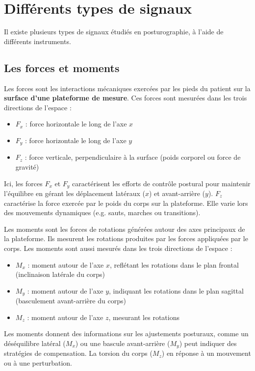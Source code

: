 \section{Différents types de signaux}

Il existe plusieurs types de signaux étudiés en posturographie, à l'aide de différents instruments.

\subsection{Les forces et moments}

Les forces sont les interactions mécaniques exercées par les pieds du patient sur la \textbf{surface d'une plateforme de mesure}.
Ces forces sont mesurées dans les trois directions de l'espace : 
\begin{itemize}
  \item $F_x$ : force horizontale le long de l'axe $x$
  \item $F_y$ : force horizontale le long de l'axe $y$ 
  \item $F_z$ : force verticale, perpendiculaire à la surface (poids corporel ou force de gravité)
\end{itemize}
Ici, les forces $F_x$ et $F_y$ caractérisent les efforts de contrôle postural pour maintenir l'équilibre 
en gérant les déplacement latéraux ($x$) et avant-arrière ($y$).
$F_z$ caractérise la force exercée par le poids du corps sur la plateforme. Elle varie 
lors des mouvements dynamiques (e.g. sauts, marches ou transitions).

Les moments sont les forces de rotations générées autour des axes principaux de la plateforme.
Ils mesurent les rotations produites par les forces appliquées par le corps.
Les moments sont aussi mesurés dans les trois directions de l'espace : 

\begin{itemize}
  \item $M_x$ : moment autour de l'axe $x$, reflétant les rotations dans le plan frontal (inclinaison latérale du corps)
  \item $M_y$ : moment autour de l'axe $y$, indiquant les rotations dans le plan sagittal (basculement avant-arrière du corps)
  \item $M_z$ : moment autour de l'axe $z$, mesurant les rotations 
\end{itemize}

Les moments donnent des informations sur les ajustements posturaux, comme un déséquilibre latéral ($M_x$) 
ou une bascule avant-arrière ($M_y$) peut indiquer des stratégies de compensation. La torsion du corps ($M_z$) en réponse à un mouvement ou à une perturbation.


